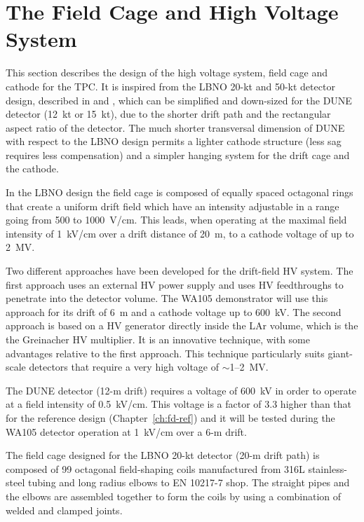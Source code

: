 \section{The Field Cage and High Voltage System} 
\label{sec:detectors-fd-alt-hv}

This section describes the design of the high voltage system, field cage and cathode for the TPC.  It is inspired from the  
LBNO 20-kt and 50-kt detector design, described in \anxlbnoa and \anxlbnob,  which can be simplified and down-sized for the DUNE detector 
(12~kt or 15~kt),  due to the shorter drift path and the rectangular aspect ratio of the detector. The much shorter transversal dimension of DUNE with respect to the LBNO design permits a lighter cathode structure (less sag requires less compensation) and a simpler hanging system for the drift cage and the cathode.

In the LBNO design the field cage is composed of equally spaced octagonal rings that create a uniform drift field which have an intensity adjustable in a range going from 500 to 1000~V/cm. This leads, when operating at the maximal field intensity of 1~kV/cm over a drift distance of 20~m, to a cathode voltage of up to 2~MV.

Two different approaches have been developed for the drift-field HV system. The first approach uses an external HV power supply and uses HV feedthroughs to penetrate into the detector volume. The  WA105 demonstrator will use this approach  for its drift
of 6~m and a cathode voltage up to 600~kV.  The second approach is based on a HV generator directly inside the LAr volume, which is the  the Greinacher HV multiplier. It is an innovative technique,  with some advantages relative to the first approach. This technique particularly suits giant-scale detectors that require a very high voltage of $\sim$1--2~MV. 

The DUNE detector (12-m drift) requires a voltage of 600~kV  in order to operate at a field intensity of 0.5~kV/cm. This voltage is a factor of 3.3 higher than that for the reference design (Chapter~\ref{ch:fd-ref}) and it will be tested during the WA105 detector operation at 1~kV/cm over a 6-m drift. 

The field cage designed for the LBNO 20-kt detector (20-m drift path) is composed of 99 octagonal field-shaping coils manufactured from 316L stainless-steel tubing and long radius elbows to EN 10217-7 shop. The straight pipes and the elbows are assembled together to form the coils by using a combination of welded and clamped joints. 

